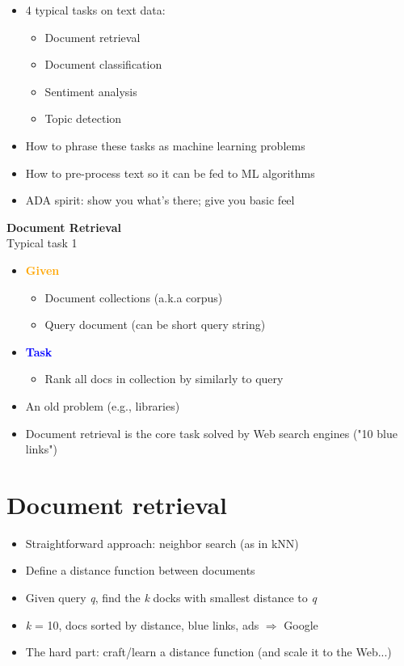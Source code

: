 \documentclass[11pt]{article}
\begin{document}
\begin{itemize}
	\item 4 typical tasks on text data:
		\begin{itemize}
			\item Document retrieval
			\item Document classification
			\item Sentiment analysis
			\item Topic detection
		\end{itemize}
	\item How to phrase these tasks as machine learning problems
	\item How to pre-process text so it can be fed to ML algorithms
	\item ADA spirit: show you what's there; give you basic feel
\end{itemize}

\newpage
\vspace{0.5cm}

\begin{center}
	{\LARGE \textbf{Document Retrieval}} \\
	Typical task 1
\end{center}
\vspace{0.5cm}

\begin{itemize}
	\item \textbf{\textcolor{orange}{Given}}
		\begin{itemize}
			\item Document collections (a.k.a corpus)
			\item Query document (can be short query string)
		\end{itemize}
	\item \textbf{\textcolor{blue}{Task}}
		\begin{itemize}
			\item Rank all docs in collection by similarly to query
		\end{itemize}
	\item An old problem (e.g., libraries)
	\item Document retrieval is the core task solved by Web search engines ("10 blue links")
\end{itemize}

\section*{Document retrieval}

\begin{itemize}
	\item Straightforward approach: neighbor search (as in kNN)
	\item Define a distance function between documents
	\item Given query \textit{q}, find the \textit{k} docks with smallest distance to \textit{q}
	\item \textit{k} = 10, docs sorted by distance, blue links, ads $\Rightarrow$ Google
	\item The hard part: craft/learn a distance function (and scale it to the Web...)
\end{itemize}
\end{document}
